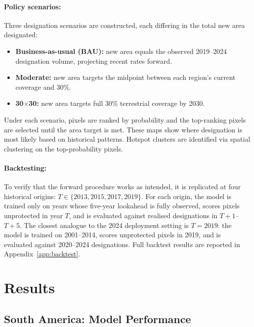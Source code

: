 \documentclass[12pt]{article}
\theoremstyle{break}
\begin{document}
\paragraph{Policy scenarios:}
Three designation scenarios are constructed, each differing
in the total new area designated:
\begin{itemize}
  \item \textbf{Business-as-usual (BAU):} new area equals the observed
    2019--2024 designation volume, projecting recent rates forward.
  \item \textbf{Moderate:} new area targets the midpoint between each
    region's current coverage and 30\%.
  \item \textbf{30$\times$30:} new area targets full 30\% terrestrial
    coverage by 2030.
\end{itemize}
Under each scenario, pixels are ranked by probability and the top-ranking pixels are
selected until the area target is met. These maps show where designation is most
likely based on historical patterns. Hotspot clusters are
identified via spatial clustering \citep{ester1996} on the top-probability pixels.

\paragraph{Backtesting:}
To verify that the forward procedure works as intended, it is replicated at four
historical origins: $T \in \{2013, 2015, 2017, 2019\}$. For each origin, the model is
trained only on years whose five-year lookahead is fully observed, scores pixels
unprotected in year $T$, and is evaluated against realised designations in
$T{+}1$--$T{+}5$. The closest analogue to the 2024 deployment setting is
$T=2019$: the model is trained on 2001--2014, scores unprotected pixels in 2019,
and is evaluated against 2020--2024 designations. Full backtest results are reported
in Appendix~\ref{app:backtest}.

\section{Results}
\label{sec:results}

\subsection{South America: Model Performance}
\label{sec:results_sa}
\end{document}
